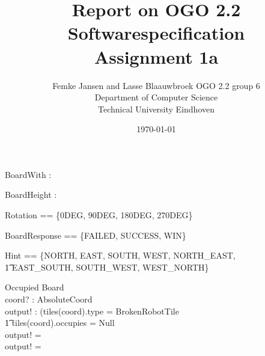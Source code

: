 \documentclass[12pt]{article}
\title{Report on OGO 2.2 Softwarespecification\\ Assignment 1a}
\author{
        Femke Jansen and Lasse Blaauwbroek OGO 2.2 group 6 \\
                Department of Computer Science\\
        Technical University Eindhoven\\
}
\date{\today}
\begin{document}
\maketitle

\begin{abstract}

\end{abstract}

\begin{axdef}
[Null]
\end{axdef}

\begin{axdef}
BoardWith : \nat
\end{axdef}

\begin{axdef}
BoardHeight : \nat
\end{axdef}

\begin{axdef}
Rotation == \{0DEG, 90DEG, 180DEG, 270DEG\}
\end{axdef}

\begin{axdef}
BoardResponse == \{FAILED, SUCCESS, WIN\}
\end{axdef}

\begin{axdef}
Hint == \{NORTH, EAST, SOUTH, WEST, NORTH\_EAST, \\ \t1 EAST\_SOUTH, SOUTH\_WEST, WEST\_NORTH\}
\end{axdef}

\begin{schema}{Occupied}
\Xi Board \\
coord? : AbsoluteCoord \\
output! : \bool
\where
\IF (tiles(coord).type = BrokenRobotTile \; \; \vee \\ \t1
tiles(coord).occupies = Null \\
\THEN
output! = \true \\
\ELSE
output! = \false
\end{schema}
\end{document}
